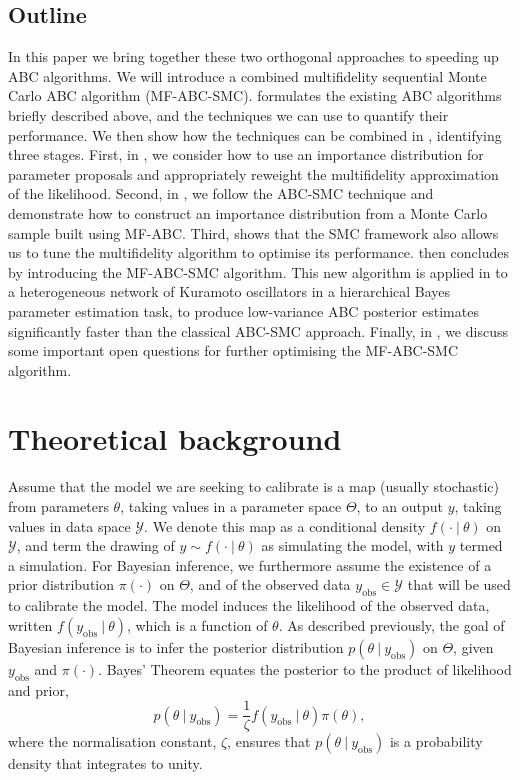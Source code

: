 \documentclass[12pt, onecolumn]{article}
\newcommand{\obs}[1]{#1_{\mathrm{obs}}}
\begin{document}
\subsection{Outline}
\label{s:Outline}
In this paper we bring together these two orthogonal approaches to speeding up ABC algorithms.
We will introduce a combined multifidelity sequential Monte Carlo ABC algorithm (MF-ABC-SMC).
 formulates the existing ABC algorithms briefly described above, and the techniques we can use to quantify their performance.
We then show how the techniques can be combined in , identifying three stages.
First, in , we consider how to use an importance distribution for parameter proposals and appropriately reweight the multifidelity approximation of the likelihood.
Second, in , we follow the ABC-SMC technique and demonstrate how to construct an importance distribution from a Monte Carlo sample built using MF-ABC.
Third,  shows that the SMC framework also allows us to tune the multifidelity algorithm to optimise its performance.
 then concludes by introducing the MF-ABC-SMC algorithm. 
This new algorithm is applied in  to a heterogeneous network of Kuramoto oscillators in a hierarchical Bayes parameter estimation task, to produce low-variance ABC posterior estimates significantly faster than the classical ABC-SMC approach.
Finally, in , we discuss some important open questions for further optimising the MF-ABC-SMC algorithm.

\section{Theoretical background}
\label{s:Background}

Assume that the model we are seeking to calibrate is a map (usually stochastic) from parameters $\theta$, taking values in a parameter space $\Theta$, to an output $y$, taking values in data space $\mathcal Y$.
We denote this map as a conditional density $f(\cdot~|~\theta)$ on $\mathcal Y$, and term the drawing of $y \sim f(\cdot~|~\theta)$ as simulating the model, with $y$ termed a simulation.
For Bayesian inference, we furthermore assume the existence of a prior distribution $\pi(\cdot)$ on $\Theta$, and of the observed data $\obs y \in \mathcal Y$ that will be used to calibrate the model.
The model induces the likelihood of the observed data, written $f(\obs y~|~\theta)$, which is a function of $\theta$.
As described previously, the goal of Bayesian inference is to infer the posterior distribution $p(\theta~|~\obs y)$ on $\Theta$, given $\obs y$ and $\pi(\cdot)$.
Bayes' Theorem equates the posterior to the product of likelihood and prior,
\[
p( \theta ~|~ \obs y) = \frac{1}{\zeta} f(\obs y~|~\theta) \pi(\theta),
\]
where the normalisation constant, $\zeta$, ensures that $p(\theta~|~\obs y)$ is a probability density that integrates to unity.
\end{document}
